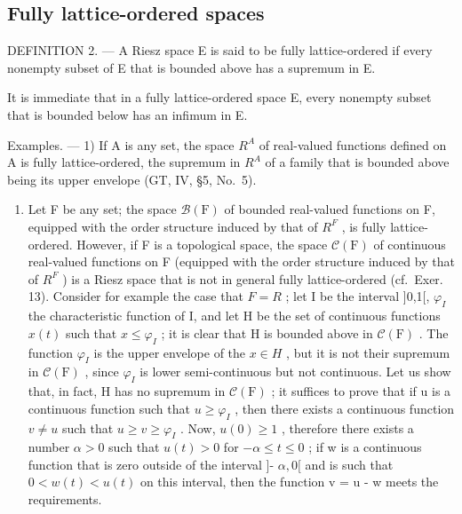 \subsection{Fully lattice-ordered spaces}

DEFINITION 2. --- A Riesz space E is said to be fully lattice-ordered if every nonempty subset of E that is bounded above has a supremum in E.

It is immediate that in a fully lattice-ordered space E, every nonempty subset that is bounded below has an infimum in E.

Examples. --- 1) If A is any set, the space \(R^{A}\) of real-valued functions defined on A is fully lattice-ordered, the supremum in \(R^{A}\) of a family that is bounded above being its upper envelope (GT, IV, §5, No.~5).

\begin{enumerate}
\def\labelenumi{\arabic{enumi})}
\setcounter{enumi}{1}
\tightlist
\item
  Let F be any set; the space \(\mathcal{B}(\mathrm{F})\) of bounded real-valued functions on F, equipped with the order structure induced by that of \(R^{F}\) , is fully lattice-ordered. However, if F is a topological space, the space \(\mathcal{C}(\mathrm{F})\) of continuous real-valued functions on F (equipped with the order structure induced by that of \(R^{F}\) ) is a Riesz space that is not in general fully lattice-ordered (cf.~Exer. 13). Consider for example the case that \(F = R\) ; let I be the interval {]}0,1{[}, \(\varphi_{I}\) the characteristic function of I, and let H be the set of continuous functions \(x(t)\) such that \(x \leqslant \varphi_{I}\) ; it is clear that H is bounded above in \(\mathcal{C}(\mathrm{F})\) . The function \(\varphi_{I}\) is the upper envelope of the \(x \in H\) , but it is not their supremum in \(\mathcal{C}(\mathrm{F})\) , since \(\varphi_{I}\) is lower semi-continuous but not continuous. Let us show that, in fact, H has no supremum in \(\mathcal{C}(\mathrm{F})\) ; it suffices to prove that if u is a continuous function such that \(u \geqslant \varphi_{I}\) , then there exists a continuous function \(v \neq u\) such that \(u \geqslant v \geqslant \varphi_{I}\) . Now, \(u(0) \geqslant 1\) , therefore there exists a number \(\alpha > 0\) such that \(u(t) > 0\) for \(-\alpha \leqslant t \leqslant 0\) ; if w is a continuous function that is zero outside of the interval {]}- \(\alpha,0[\) and is such that \(0 < w(t) < u(t)\) on this interval, then the function v = u - w meets the requirements.
\end{enumerate}

